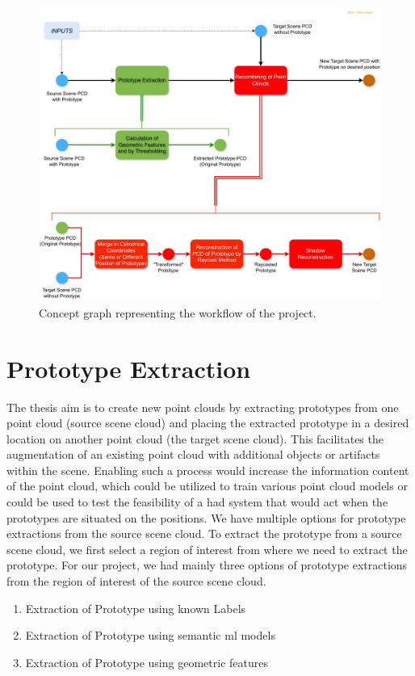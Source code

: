 \begin{figure}[htbp]
    \centering
    \includegraphics[width=1\linewidth]{97_graphics/concepts/graph_main.pdf}
    \caption{Concept graph representing the workflow of the project.}
    \label{fig:concept-graph}
\end{figure}



\section{Prototype Extraction}
The thesis aim is to create new point clouds by extracting prototypes from one point cloud (source scene cloud) and placing the extracted prototype in a desired location on another point cloud (the target scene cloud). This facilitates the augmentation of an existing point cloud with additional objects or artifacts within the scene. Enabling such a process would increase the information content of the point cloud, which could be utilized to train various point cloud models or could be used to test the feasibility of a \acrshort{had} system that would act when the prototypes are situated on the positions.
We have multiple options for prototype extractions from the source scene cloud. To extract the prototype from a source scene cloud, we first select a region of interest from where we need to extract the prototype. For our project, we had mainly three options of prototype extractions from the region of interest of the source scene cloud. 
\begin{enumerate}
    \item Extraction of Prototype using known Labels
    \item Extraction of Prototype using semantic \acrshort{ml} models
    \item Extraction of Prototype using geometric features
\end{enumerate}


